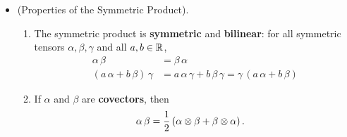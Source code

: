 \documentclass[11pt]{article}
\begin{document}
\begin{itemize}
\item \begin{proposition} (Properties of the Symmetric Product).\\
\begin{enumerate}
\item The symmetric product is \textbf{symmetric} and \textbf{bilinear}: for all symmetric tensors $\alpha, \beta, \gamma$ and all $a, b \in {\mathbb R}$,
\begin{align*}
\alpha\, \beta &= \beta\, \alpha \\
(a\,\alpha + b\,\beta)\,\gamma &= a\,\alpha\,\gamma + b\,\beta\,\gamma = \gamma\, (a\,\alpha + b\,\beta)
\end{align*}
\item  If $\alpha$ and $\beta$ are \textbf{covectors}, then
\begin{align*}
\alpha\,\beta &=\frac{1}{2}\left(\alpha \otimes \beta + \beta \otimes \alpha\right).
\end{align*}
\end{enumerate}
\end{proposition}
\end{itemize}
\end{document}
